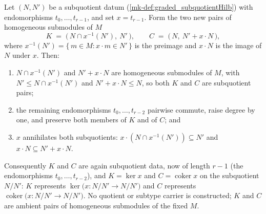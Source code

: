 \begin{lemma}
  Let \((N, N')\) be a subquotient datum (\ref{mk-def:graded_subquotientHilb}) with
  endomorphisms \(t_0, \dots, t_{r-1}\), and set \(x = t_{r-1}\). Form the two new
  pairs of homogeneous submodules of \(M\)
  \[
    K \;=\; \bigl(\,N \cap x^{-1}(N'),\ N'\,\bigr),
    \qquad
    C \;=\; \bigl(\,N,\ N' + x \cdot N\,\bigr),
  \]
  where \(x^{-1}(N') = \{\,m \in M : x \cdot m \in N'\,\}\) is the preimage and
  \(x \cdot N\) is the image of \(N\) under \(x\). Then:
  \begin{enumerate}
    \item \(N \cap x^{-1}(N')\) and \(N' + x \cdot N\) are homogeneous submodules of
      \(M\), with \(N' \le N \cap x^{-1}(N')\) and \(N' + x \cdot N \le N\), so both
      \(K\) and \(C\) are subquotient pairs;
    \item the remaining endomorphisms \(t_0, \dots, t_{r-2}\) pairwise commute,
      raise degree by one, and preserve both members of \(K\) and of \(C\); and
    \item \(x\) annihilates both subquotients: \(x \cdot (N \cap x^{-1}(N')) \subseteq N'\)
      and \(x \cdot N \subseteq N' + x \cdot N\).
  \end{enumerate}
  Consequently \(K\) and \(C\) are again subquotient data, now of length \(r-1\)
  (the endomorphisms \(t_0, \dots, t_{r-2}\)), and \(K = \ker x\) and \(C =
  \operatorname{coker} x\) on the subquotient \(N/N'\): \(K\) represents
  \(\ker\bigl(x : N/N' \to N/N'\bigr)\) and \(C\) represents
  \(\operatorname{coker}\bigl(x : N/N' \to N/N'\bigr)\). No quotient or subtype
  carrier is constructed; \(K\) and \(C\) are ambient pairs of homogeneous
  submodules of the fixed \(M\).
\end{lemma}

